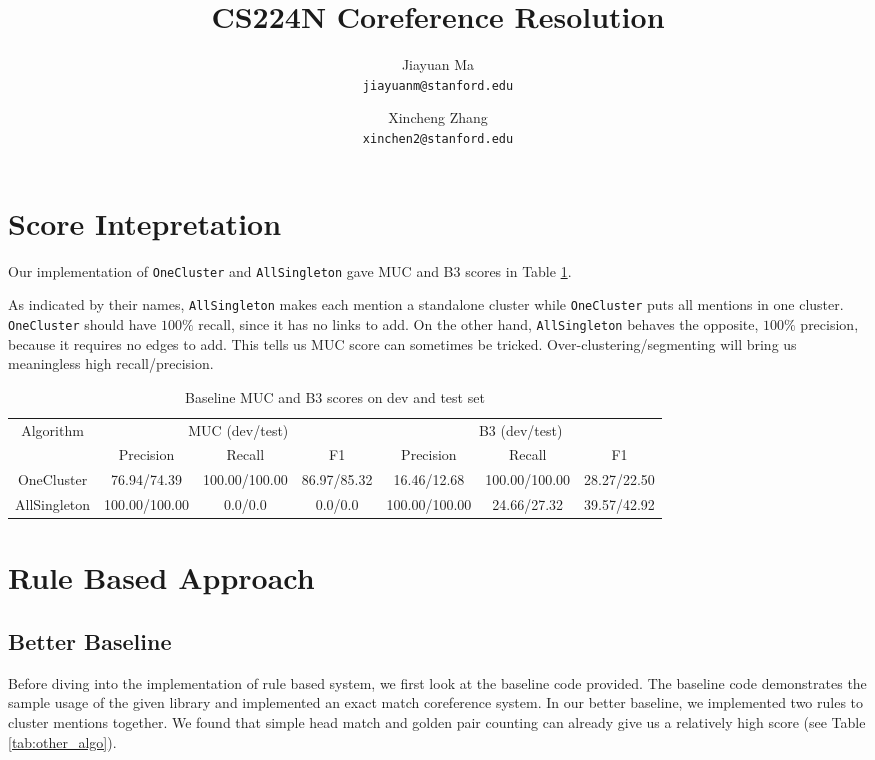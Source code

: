 \documentclass[letterpaper]{article}
\begin{document}
\title{CS224N Coreference Resolution}
\author{
        Jiayuan Ma \\
        \texttt{jiayuanm@stanford.edu}
        \and
        Xincheng Zhang\\
        \texttt{xinchen2@stanford.edu}
}
\maketitle

\section{Score Intepretation}
Our implementation of \texttt{OneCluster} and \texttt{AllSingleton} gave MUC and B3 scores in Table \ref{tab:baseline}.

As indicated by their names, \texttt{AllSingleton} makes each mention a standalone cluster while \texttt{OneCluster} puts all mentions in one cluster. \texttt{OneCluster} should have $100\%$ recall, since it has no links to add. On the other hand, \texttt{AllSingleton} behaves the opposite, $100\%$ precision, because it requires no edges to add.
This tells us MUC score can sometimes be tricked. Over-clustering/segmenting will bring us meaningless high recall/precision.
\begin{table}[h]
\begin{center}
\begin{tabular}{|c|c|c|c|c|c|c|}
\hline
\multirow{2}{*}{Algorithm} & 
\multicolumn{3}{c|}{MUC (dev/test)} & \multicolumn{3}{c|}{B3 (dev/test)}  \\
\hhline{~------}
& Precision & Recall & F1 & Precision & Recall & F1 \\
\hline
OneCluster & 76.94/74.39 & 100.00/100.00  & 86.97/85.32 & 16.46/12.68 & 100.00/100.00 & 28.27/22.50 \\
\hline
AllSingleton & 100.00/100.00 & 0.0/0.0 & 0.0/0.0 & 100.00/100.00 & 24.66/27.32 & 39.57/42.92 \\
\hline
\end{tabular}
\caption{Baseline MUC and B3 scores on dev and test set}\label{tab:baseline}
\end{center}
\end{table}

\section{Rule Based Approach}
\subsection{Better Baseline}
Before diving into the implementation of rule based system, we first look at the baseline code provided. The baseline code demonstrates the sample usage of the given library and implemented an exact match coreference system. In our better baseline, we implemented two rules to cluster mentions together. We found that simple head match and golden pair counting can already give us a relatively high score (see Table \ref{tab:other_algo}).
\end{document}
